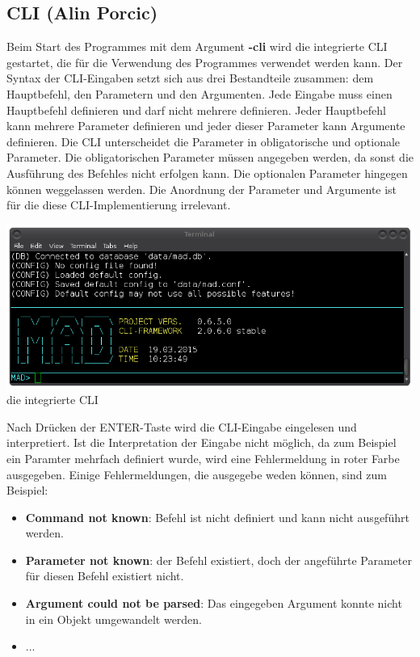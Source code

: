 \documentclass[12pt,a4paper]{report}
\begin{document}
\begin{onehalfspace}
\section{CLI (Alin Porcic)}

Beim Start des Programmes mit dem Argument \textbf{-cli} wird die integrierte CLI gestartet, die für die Verwendung des Programmes verwendet werden kann. Der Syntax der CLI-Eingaben setzt sich aus drei Bestandteile zusammen: dem Hauptbefehl, den Parametern und den Argumenten. Jede Eingabe muss einen Hauptbefehl definieren und darf nicht mehrere definieren. Jeder Hauptbefehl kann mehrere Parameter definieren und jeder dieser Parameter kann Argumente definieren. Die CLI unterscheidet die Parameter in obligatorische und optionale Parameter. Die obligatorischen Parameter müssen angegeben werden, da sonst die Ausführung des Befehles nicht erfolgen kann. Die optionalen Parameter hingegen können weggelassen werden. Die Anordnung der Parameter und Argumente ist für die diese CLI-Implementierung irrelevant.\\

\begin{center}
\includegraphics[scale=0.5]{img/cli_mad.png}\\
die integrierte CLI
\end{center}

Nach Drücken der ENTER-Taste wird die CLI-Eingabe eingelesen und interpretiert. Ist die Interpretation der Eingabe nicht möglich, da zum Beispiel ein Paramter mehrfach definiert wurde, wird eine Fehlermeldung in roter Farbe ausgegeben. Einige Fehlermeldungen, die ausgegebe weden können, sind zum Beispiel:

\begin{itemize}
\item \textbf{Command not known}: Befehl ist nicht definiert und kann nicht ausgeführt werden.
\item \textbf{Parameter not known}: der Befehl existiert, doch der angeführte Parameter für diesen Befehl existiert nicht.
\item \textbf{Argument could not be parsed}: Das eingegeben Argument konnte nicht in ein Objekt umgewandelt werden.
\item ...
\end{itemize}


\end{onehalfspace}
\end{document}
